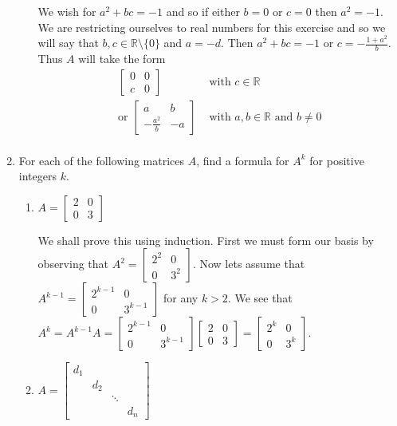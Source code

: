 \documentclass[letterpaper]{article}
\begin{document}
\begin{enumerate}
\begin{enumerate}
  We wish for $a^2+bc=-1$ and so if either $b=0$ or $c=0$ then $a^2=-1$. We are restricting ourselves to real numbers for this exercise and so we will say that $b,c\in \mathbb{R}\setminus\{0\}$ and $a=-d$. Then $a^2+bc=-1$ or $c=-\frac{1+a^2}{b}$. Thus $A$ will take the form
  \begin{align*}
    \left[\begin{array}{cc}0&0\\c&0\end{array}\right]
    &\text{ with }c\in \mathbb{R}\\
    \text{or }
    \left[\begin{array}{cc}a&b\\-\frac{a^2}{b}&-a\end{array}\right]&
    \text{ with }a,b\in \mathbb{R}\text{ and }b\ne 0\\
  \end{align*}
  \end{enumerate}
\item
For each of the following matrices $A$, find a formula for $A^k$ for positive integers $k$.
  \begin{enumerate}
  \item
  $A=\left[\begin{array}{cc}2&0\\0&3\end{array}\right]$

  We shall prove this using induction. First we must form our basis by observing that
  $A^2=\left[\begin{array}{cc}2^2&0\\0&3^2\end{array}\right]$.
  Now lets assume that
  $A^{k-1}=\left[\begin{array}{cc}2^{k-1}&0\\0&3^{k-1}\end{array}\right]$
  for any $k>2$.
  We see that
  $A^k=A^{k-1}A=\left[\begin{array}{cc}2^{k-1}&0\\0&3^{k-1}\end{array}\right]\left[\begin{array}{cc}2&0\\0&3\end{array}\right]=\left[\begin{array}{cc}2^k&0\\0&3^k\end{array}\right]$.
  \item
  $A=\left[\begin{array}{cccc}d_1&&&\\&d_2&&\\&&\ddots&\\&&&d_n\end{array}\right]$


\end{enumerate}
\end{enumerate}
\end{document}
